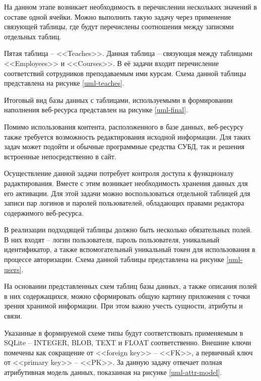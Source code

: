 На данном этапе возникает необходимость в перечислении нескольких значений в составе одной ячейки.
Можно выполнить такую задачу через применение связующей таблицы, где будут перечислены соотношения между записями отдельных таблиц.

Пятая таблица -- <<Teaches>>.
Данная таблица -- связующая между таблицами <<Employees>> и <<Courses>>.
В её задачи входит перечисление соответствий сотрудников преподаваемым ими курсам.
Схема данной таблицы представлена на рисунке \ref{uml-teaches}.

Итоговый вид базы данных с таблицами, используемыми в формировании наполнения веб-ресурса представлен на рисунке \ref{uml-final}.



Помимо использования контента, расположенного в базе данных, веб-ресурсу также требуется возможность редактирования исходной информации.
Для таких задач может подойти и обычные программные средства СУБД, так и решения встроенные непосредственно в сайт.

Осуществление данной задачи потребует контроля доступа к функционалу радактирования.
Вместе с этим возникает необходимость хранения данных для его активации.
Для этой задачи можно воспользоваться отдельной таблицей для записи пар логинов и паролей пользователей, обладающих правами редактора содержимого веб-ресурса.

В реализации подходящей таблицы должно быть несколько обязательных полей.
В них входят -- логин пользователя, пароль пользователя, уникальный идентификатор, а также вспомогательный уникальный токен для использования в процессе авторизации.
Схема данной таблицы представлена на рисунке \ref{uml-users}.

На основании представленных схем таблиц базы данных, а также описания полей в них содержащихся, можно сформировать общую картину приложения с точки зрения хранимой информации.
При этом важно учесть сущности, атрибуты и связи.

Указанные в формируемой схеме типы будут соответствовать применяемым в SQLite -- INTEGER, BLOB, TEXT и FLOAT соответственно.
Внешние ключи помечены как сокращение от <<foreign key>> -- <<FK>>, а первичный ключ от <<primary key>> -- <<PK>>.
За данную задачу отвечает полная атрибутивная модель данных, показанная на рисунке \ref{uml-attr-model}.


